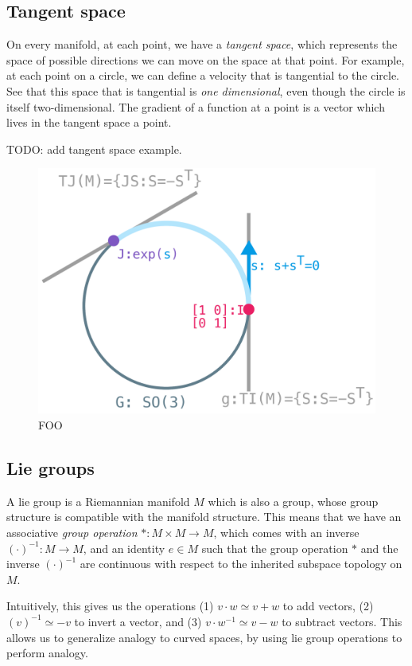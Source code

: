 \documentclass[11pt]{book}
\begin{document}
\subsection{Tangent space}
On every manifold, at each point, we have a \emph{tangent space}, which
represents the space of possible directions we can move on the space at that
point. For example, at each point on a circle, we can define a velocity that is
tangential to the circle. See that this space that is tangential is \emph{one dimensional},
even though the circle is itself two-dimensional. The gradient of a function at a point is a
vector which lives in the tangent space a point.

TODO: add tangent space example.

\begin{figure}[htb]
\includegraphics{./lie-group.pdf}
\caption{FOO}
\end{figure}

\subsection{Lie groups}
A lie group is a Riemannian manifold $M$ which is also a group, whose group
structure is compatible with the manifold structure. This means that we have
an associative \emph{group operation} $*: M \times M \rightarrow M$, which comes with an
inverse $(\cdot)^{-1} : M \rightarrow M$, and an identity $e \in M$ such that the group operation $*$
and the inverse $(\cdot)^{-1}$ are continuous with respect to the inherited
subspace topology on $M$.

Intuitively, this gives us the operations (1) $v \cdot w \simeq v + w$ to add
vectors, (2)  $(v)^{-1} \simeq -v$ to invert a vector, and (3) $v \cdot w^{-1} \simeq v - w$
to subtract vectors. This allows us to generalize analogy to curved spaces, by using
lie group operations to perform analogy.
\end{document}
